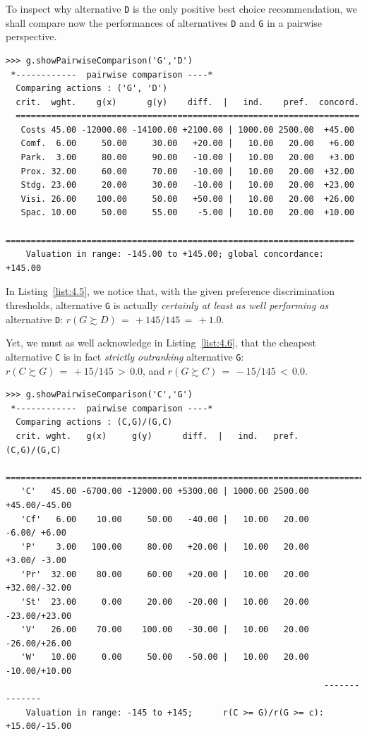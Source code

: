 To inspect why alternative \texttt{D} is the only positive best choice recommendation, we shall compare now the performances of alternatives \texttt{D} and \texttt{G} in a pairwise perspective.
\begin{lstlisting}[caption={Inspecting pairwise comparison between alternatives \texttt{G} and \texttt{D}},label=list:4.5,basicstyle=\ttfamily\scriptsize]
>>> g.showPairwiseComparison('G','D')
 *------------  pairwise comparison ----*
  Comparing actions : ('G', 'D')
  crit.  wght.    g(x)      g(y)    diff.  |   ind.    pref.  concord. 
  ====================================================================
   Costs 45.00 -12000.00 -14100.00 +2100.00 | 1000.00 2500.00  +45.00  
   Comf.  6.00     50.00     30.00   +20.00 |   10.00   20.00   +6.00 
   Park.  3.00     80.00     90.00   -10.00 |   10.00   20.00   +3.00 
   Prox. 32.00     60.00     70.00   -10.00 |   10.00   20.00  +32.00 
   Stdg. 23.00     20.00     30.00   -10.00 |   10.00   20.00  +23.00 
   Visi. 26.00    100.00     50.00   +50.00 |   10.00   20.00  +26.00 
   Spac. 10.00     50.00     55.00    -5.00 |   10.00   20.00  +10.00
   =====================================================================
    Valuation in range: -145.00 to +145.00; global concordance: +145.00
\end{lstlisting}
In Listing~\vref{list:4.5}, we notice that, with the given preference discrimination thresholds, alternative \texttt{G} is actually \emph{certainly at least as well performing as} alternative \texttt{D}:  $r(G \succsim D)\, = \, +145/145\, =\, +1.0$.

Yet, we must as well acknowledge in Listing~\vref{list:4.6}, that the cheapest alternative \texttt{C} is in fact \emph{strictly outranking} alternative \texttt{G}:  $r(C \succsim G)\, =\, +15/145\, >\, 0.0$, and $r(G \succsim C)\, =\, -15/145 \,<\, 0.0$.
\begin{lstlisting}[caption={Inspecting pairwise comparison between alternatives \texttt{C} and \texttt{G}},label=list:4.6,basicstyle=\ttfamily\scriptsize]
>>> g.showPairwiseComparison('C','G')
 *------------  pairwise comparison ----*
  Comparing actions : (C,G)/(G,C)
  crit. wght.   g(x)     g(y)      diff.  |   ind.   pref.       (C,G)/(G,C)
   ==========================================================================
   'C'   45.00 -6700.00 -12000.00 +5300.00 | 1000.00 2500.00    +45.00/-45.00 
   'Cf'   6.00    10.00     50.00   -40.00 |   10.00   20.00     -6.00/ +6.00 
   'P'    3.00   100.00     80.00   +20.00 |   10.00   20.00     +3.00/ -3.00 
   'Pr'  32.00    80.00     60.00   +20.00 |   10.00   20.00    +32.00/-32.00 
   'St'  23.00     0.00     20.00   -20.00 |   10.00   20.00    -23.00/+23.00 
   'V'   26.00    70.00    100.00   -30.00 |   10.00   20.00    -26.00/+26.00 
   'W'   10.00     0.00     50.00   -50.00 |   10.00   20.00    -10.00/+10.00
                                                               --------------
    Valuation in range: -145 to +145;      r(C >= G)/r(G >= c): +15.00/-15.00
\end{lstlisting}

